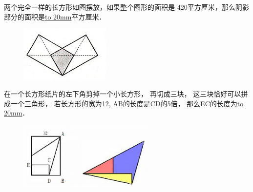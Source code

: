 \item {
    {两个完全一样的长方形如图摆放，如果整个图形的面积是 420平方厘米，那么阴影部分的面积是\underline{\hbox to 20mm{}}平方厘米．} 
    \begin{figure}[H] 
        \centering
        \includegraphics[width=0.4\textwidth]{./pics/Chapter_3/5.png}
    \end{figure}
    \vspace{1cm}
}
\item {
    {在一个长方形纸片的左下角剪掉一个小长方形，
    再切成三块， 这三块恰好可以拼成一个三角形，
    若长方形的宽为12, AB的长度是CD的5倍，
    那么EC的长度为\underline{\hbox to 20mm{}}．} 
    \begin{figure}[H] 
        \centering
        \includegraphics[width=0.6\textwidth]{./pics/Chapter_3/6.png}
    \end{figure}
    \vspace{1cm}
}

